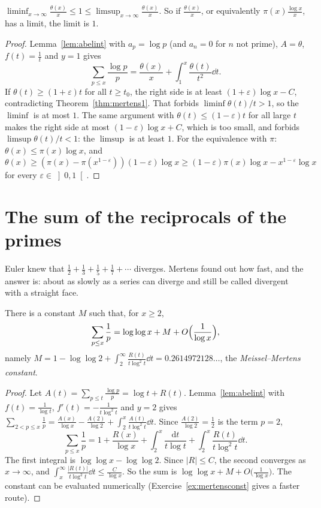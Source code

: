 \begin{corollary}[Chebyshev, 1852]\label{cor:chebratio}
$\displaystyle\liminf_{x\to\infty}\frac{\theta(x)}x\le1\le\limsup_{x\to\infty}\frac{\theta(x)}x$. So if $\frac{\theta(x)}x$, or equivalently $\pi(x)\frac{\log x}x$, has a limit, the limit is $1$.
\end{corollary}
\begin{proof}
Lemma~\ref{lem:abelint} with $a_p=\log p$ (and $a_n=0$ for $n$ not prime), $A=\theta$, $f(t)=\frac1t$ and $y=1$ gives
\[
\sum_{p\le x}\frac{\log p}p=\frac{\theta(x)}x+\int_1^x\frac{\theta(t)}{t^2}\dd t.
\]
If $\theta(t)\ge(1+\varepsilon)t$ for all $t\ge t_0$, the right side is at least $(1+\varepsilon)\log x-C$, contradicting Theorem~\ref{thm:mertens1}. That forbids $\liminf\theta(t)/t>1$, so the $\liminf$
is at most $1$. The same argument with $\theta(t)\le(1-\varepsilon)t$ for all large $t$ makes the right side at most $(1-\varepsilon)\log x+C$, which is too small, and forbids $\limsup\theta(t)/t<1$: the $\limsup$
is at least $1$. For the equivalence with $\pi$: $\theta(x)\le\pi(x)\log x$, and
$\theta(x)\ge(\pi(x)-\pi(x^{1-\varepsilon}))(1-\varepsilon)\log x\ge(1-\varepsilon)\pi(x)\log x-x^{1-\varepsilon}\log x$ for every $\varepsilon\in\left]0,1\right[$.
\end{proof}

\section{The sum of the reciprocals of the primes}

Euler knew that $\frac12+\frac13+\frac15+\frac17+\cdots$ diverges. Mertens found out how fast, and the answer is: about as slowly as a series can
diverge and still be called divergent with a straight face.

\begin{theorem}[Mertens, 1874]\label{thm:mertens2}
There is a constant $M$ such that, for $x\ge2$,
\[
\sum_{p\le x}\frac1p=\log\log x+M+O\Bigl(\frac1{\log x}\Bigr),
\]
namely $M=1-\log\log2+\int_2^\infty\frac{R(t)}{t\log^2t}\dd t=0.2614972128\ldots$, the \emph{Meissel--Mertens constant}.
\end{theorem}
\begin{proof}
Let $A(t)=\sum_{p\le t}\frac{\log p}p=\log t+R(t)$. Lemma~\ref{lem:abelint} with $f(t)=\frac1{\log t}$, $f'(t)=-\frac1{t\log^2t}$ and $y=2$ gives
$\sum_{2<p\le x}\frac1p=\frac{A(x)}{\log x}-\frac{A(2)}{\log2}+\int_2^x\frac{A(t)}{t\log^2t}\dd t$. Since $\frac{A(2)}{\log2}=\frac12$ is the term $p=2$,
\[
\sum_{p\le x}\frac1p=1+\frac{R(x)}{\log x}+\int_2^x\frac{\mathrm dt}{t\log t}+\int_2^x\frac{R(t)}{t\log^2t}\dd t.
\]
The first integral is $\log\log x-\log\log2$. Since $|R|\le C$, the second converges as $x\to\infty$, and $\int_x^\infty\frac{|R(t)|}{t\log^2t}\dd t\le\frac C{\log x}$. So the sum is
$\log\log x+M+O\bigl(\frac1{\log x}\bigr)$. The constant can be evaluated numerically (Exercise~\ref{ex:mertensconst} gives a faster route).
\end{proof}

